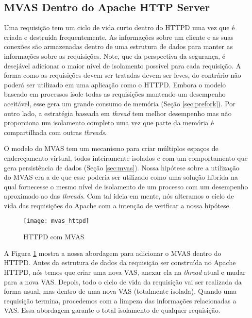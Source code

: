 \subsection{MVAS Dentro do Apache HTTP Server}

Uma requisição tem um ciclo de vida curto dentro do HTTPD uma vez que é criada
e destruída frequentemente. As informações sobre um cliente e as suas conexões
são armazenadas dentro de uma estrutura de dados para manter as informações
sobre as requisições. Note, que da perspectiva da segurança, é desejável
adicionar o maior nível de isolamento possível para cada requisição. A forma
como as requisições devem ser tratadas devem ser leves, do contrário não poderá
ser utilizado em uma aplicação como o HTTPD. Embora o modelo baseado em
processos isole todas as requisições mantendo um desempenho aceitável, esse
gera um grande consumo de memória (Seção \ref{sec:prefork}).  Por outro lado, a
estratégia baseada em \emph{thread} tem melhor desempenho mas não
proporciona um isolamento completo uma vez que parte da memória é compartilhada
com outras \emph{threads}.

O modelo do MVAS tem um mecanismo para criar múltiplos espaços de endereçamento
virtual, todos inteiramente isolados e com um comportamento que gera
persistência de dados (Seção \ref{sec:mvas}). Nossa hipótese sobre a utilização
do MVAS era a de que esse poderia ser utilizado como uma solução híbrida na
qual fornecesse o mesmo nível de isolamento de um processo com um desempenho
aproximado ao das \emph{threads}. Com tal ideia em mente, nós alteramos o ciclo
de vida das requisições do Apache com a intenção de verificar a nossa hipótese.

\begin{figure}[!h]
  \centering
  \texttt{[image: mvas\_httpd]}
  
  \caption{HTTPD com MVAS}
  \label{fig:httpd_mvas}
\end{figure}

A Figura \ref{fig:httpd_mvas} mostra a nossa abordagem para adicionar o MVAS
dentro do HTTPD. Antes da estrutura de dados da requisição ser construída no
Apache HTTPD, nós temos que criar uma nova VAS, anexar ela na \emph{thread}
atual e mudar para a nova VAS. Depois, todo o ciclo de vida da requisição vai
ser realizada da forma usual, mas dentro de uma nova VAS (totalmente isolada).
Quando uma requisição termina, procedemos com a limpeza das informações
relacionadas a VAS. Essa abordagem garante o total isolamento de qualquer
requisição.


